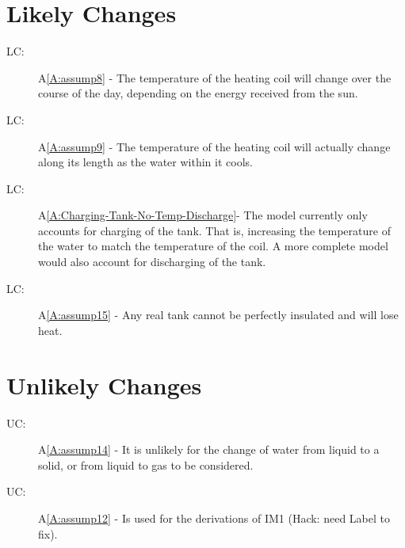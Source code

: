 \documentclass[12pt]{article}
\newcounter{lcnum}
\newcommand{\lcthelcnum}{LC\thelcnum}
\newcounter{ucnum}
\newcommand{\uctheucnum}{UC\theucnum}
\begin{document}
\section{Likely Changes}
\label{Sec:LCs}
\begin{description}
\item[\lcthelcnum\label{Temperature-Coil-Variable-Over-Day}:]A\ref{A:assump8} - The temperature of the heating coil will change over the course of the day, depending on the energy received from the sun.
\end{description}
\begin{description}
\item[\lcthelcnum\label{Temperature-Coil-Variable-Over-Length}:]A\ref{A:assump9} - The temperature of the heating coil will actually change along its length as the water within it cools.
\end{description}
\begin{description}
\item[\lcthelcnum\label{Discharging-Tank}:]A\ref{A:Charging-Tank-No-Temp-Discharge}- The model currently only accounts for charging of the tank. That is, increasing the temperature of the water to match the temperature of the coil. A more complete model would also account for discharging of the tank.
\end{description}
\begin{description}
\item[\lcthelcnum\label{Tank-Lose-Heat}:]A\ref{A:assump15} - Any real tank cannot be perfectly insulated and will lose heat.
\end{description}
\section{Unlikely Changes}
\label{Sec:UCs}
\begin{description}
\item[\uctheucnum\label{Water-Fixed-States}:]A\ref{A:assump14} - It is unlikely for the change of water from liquid to a solid, or from liquid to gas to be considered.
\end{description}
\begin{description}
\item[\uctheucnum\label{No-Internal-Heat-Generation}:]A\ref{A:assump12} - Is used for the derivations of IM1 (Hack: need Label to fix).
\end{description}
\end{document}
